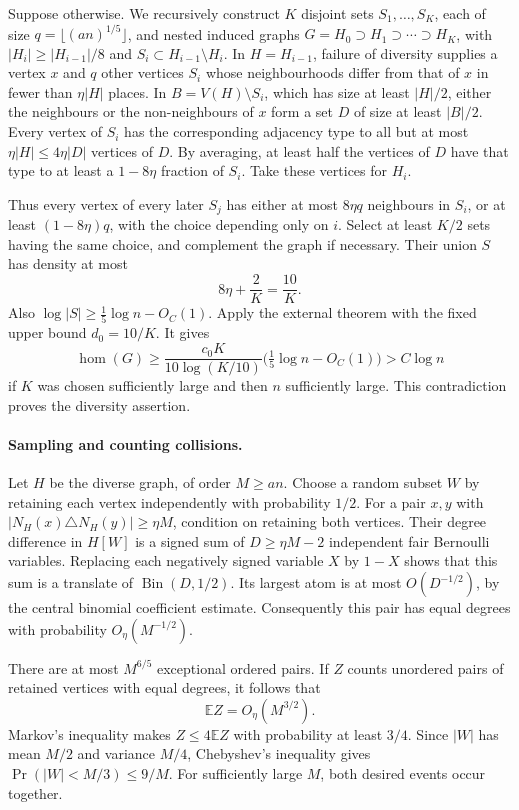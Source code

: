 Suppose otherwise. We recursively construct \(K\) disjoint sets
\(S_1,\ldots,S_K\), each of size
\(q=\lfloor(an)^{1/5}\rfloor\), and nested induced graphs
\(G=H_0\supset H_1\supset\cdots\supset H_K\), with
\(|H_i|\geq|H_{i-1}|/8\) and \(S_i\subset H_{i-1}\setminus H_i\).
In \(H=H_{i-1}\), failure of diversity supplies a vertex \(x\)
and \(q\) other vertices \(S_i\) whose neighbourhoods differ from
that of \(x\) in fewer than \(\eta|H|\) places.
In \(B=V(H)\setminus S_i\), which has size at least \(|H|/2\),
either the neighbours or the non-neighbours of \(x\) form a set
\(D\) of size at least \(|B|/2\).
Every vertex of \(S_i\) has the corresponding adjacency type to all
but at most \(\eta|H|\leq4\eta|D|\) vertices of \(D\).
By averaging, at least half the vertices of \(D\) have that type
to at least a \(1-8\eta\) fraction of \(S_i\).
Take these vertices for \(H_i\).

Thus every vertex of every later \(S_j\) has either at most
\(8\eta q\) neighbours in \(S_i\), or at least
\((1-8\eta)q\), with the choice depending only on \(i\).
Select at least \(K/2\) sets having the same choice, and complement
the graph if necessary. Their union \(S\) has density at most
\[
 8\eta+\frac{2}{K}=\frac{10}{K}.
\]
Also \(\log|S|\geq\tfrac15\log n-O_C(1)\).
Apply the external theorem with the fixed upper bound \(d_0=10/K\).
It gives
\[
 \operatorname{hom}(G)\geq
 \frac{c_0K}{10\log(K/10)}
       \bigl(\tfrac15\log n-O_C(1)\bigr)>C\log n
\]
if \(K\) was chosen sufficiently large and then \(n\) sufficiently
large. This contradiction proves the diversity assertion.

\paragraph{Sampling and counting collisions.}
Let \(H\) be the diverse graph, of order \(M\geq an\).
Choose a random subset \(W\) by retaining each vertex independently
with probability \(1/2\).
For a pair \(x,y\) with
\(|N_H(x)\triangle N_H(y)|\geq\eta M\), condition on retaining
both vertices. Their degree difference in \(H[W]\) is a signed sum
of \(D\geq\eta M-2\) independent fair Bernoulli variables.
Replacing each negatively signed variable \(X\) by \(1-X\)
shows that this sum is a translate of
\(\operatorname{Bin}(D,1/2)\).
Its largest atom is at most \(O(D^{-1/2})\), by the central
binomial coefficient estimate. Consequently this pair has equal
degrees with probability \(O_\eta(M^{-1/2})\).

There are at most \(M^{6/5}\) exceptional ordered pairs.
If \(Z\) counts unordered pairs of retained vertices with equal
degrees, it follows that
\[
 \mathbb EZ=O_\eta(M^{3/2}).
\]
Markov's inequality makes \(Z\leq4\mathbb EZ\) with probability
at least \(3/4\). Since \(|W|\) has mean \(M/2\) and variance
\(M/4\), Chebyshev's inequality gives
\(\Pr(|W|<M/3)\leq9/M\).
For sufficiently large \(M\), both desired events occur together.

